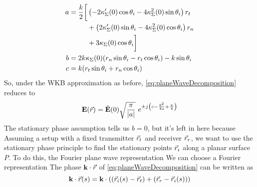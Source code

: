 \documentclass{article}
\begin{document}
\begin{subequations}
\begin{align}
   a &= \begin{aligned}[t]
      \frac{k}{2} \biggl[ & \left(-2 \kappa_{\Sigma}'(0) \cos\theta_i - 4
      \kappa_{\Sigma}^2(0) \sin\theta_i \right) r_t \\
      & + \left(2 \kappa_{\Sigma}'(0)
      \sin\theta_i - 4 \kappa_{\Sigma}^2(0) \cos\theta_i \right) r_n \\
      & + 3 \kappa_{\Sigma}(0)\cos\theta_i \biggr]
   \end{aligned} \\
   b &= 2 k \kappa_{\Sigma}(0) (r_n \sin\theta_i - r_t \cos\theta_i) - k
   \sin\theta_i \\
   c &= k (r_t \sin\theta_i + r_n \cos\theta_i)
\end{align}
\end{subequations}
So, under the WKB approximation as before, \eqref{eq:planeWaveDecomposition} reduces
to
\begin{equation}
   \mathbf{E}(\vec{r}) = \tilde{\mathbf{E}}(0) \sqrt{\frac{\pi}{\lvert a \rvert}} \ e^{ \pm j \left(c
      - \frac{b^2}{4a} + \frac{\pi}{4} \right)}
   \label{eq:unexpandedReflGO}
\end{equation}
The stationary phase assumption tells us $b=0$, but it's left in here because
Assuming a setup with a fixed transmitter $\vec{r}_t$ and receiver $\vec{r}_r$, we want to
use the stationary phase principle to find the stationary points $\vec{r}_i$ along a
planar surface $P$. To do this, the Fourier plane wave representation We can choose a Fourier representation The phase $\mathbf{k} \cdot \vec{r}$ of
\eqref{eq:planeWaveDecomposition} can be written as 
\begin{equation}
   \mathbf{k} \cdot \vec{r}(s) = \mathbf{k} \cdot \left( (\vec{r}_i(s) - \vec{r}_t ) + ( \vec{r}_r -
      \vec{r}_i(s) ) \right)
   \label{eq:phaseReflection}
\end{equation}
\end{document}
